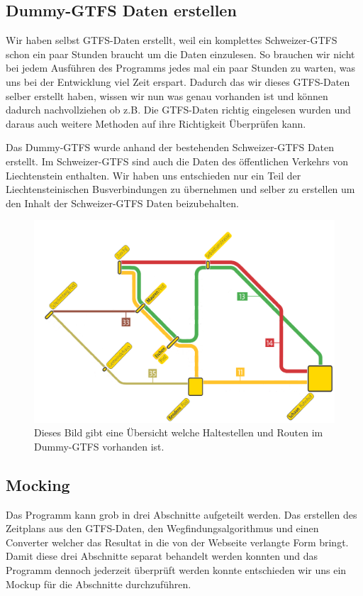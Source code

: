 
\subsection{Dummy-GTFS Daten erstellen}
Wir haben selbst GTFS-Daten erstellt, weil ein komplettes Schweizer-GTFS schon ein paar Stunden braucht um die Daten einzulesen. So brauchen wir nicht bei jedem Ausführen des Programms jedes mal ein paar Stunden zu warten, was uns bei der Entwicklung viel Zeit erspart. Dadurch das wir dieses GTFS-Daten selber erstellt haben, wissen wir nun was genau vorhanden ist und können dadurch nachvollziehen ob z.B. Die GTFS-Daten richtig eingelesen wurden und daraus auch weitere Methoden auf ihre Richtigkeit Überprüfen kann.\newline

Das Dummy-GTFS wurde anhand der bestehenden Schweizer-GTFS Daten erstellt. Im Schweizer-GTFS sind auch die Daten des öffentlichen Verkehrs von Liechtenstein enthalten. Wir haben uns entschieden nur ein Teil der Liechtensteinischen Busverbindungen zu übernehmen und selber zu erstellen um den Inhalt der Schweizer-GTFS Daten beizubehalten.

\begin{figure}[h]
	\centering
	\includegraphics[width=12cm]{img/LiniennetzDummyGTFS.png}
	\caption{Dieses Bild gibt eine Übersicht welche Haltestellen und Routen im Dummy-GTFS vorhanden ist.}
	\label{fig:DummyGTFS-uebersicht}
\end{figure}

\subsection{Mocking}
Das Programm kann grob in drei Abschnitte aufgeteilt werden. Das erstellen des Zeitplans aus den GTFS-Daten, den Wegfindungsalgorithmus und einen Converter welcher das Resultat in die von der Webseite verlangte Form bringt. Damit diese drei Abschnitte separat behandelt werden konnten und das Programm dennoch jederzeit überprüft werden konnte entschieden wir uns ein Mockup für die Abschnitte durchzuführen.

